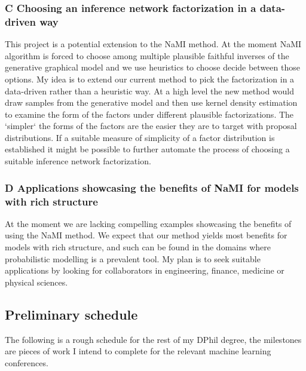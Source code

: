 \documentclass[12pt]{article}
\begin{document}
\subsubsection*{C \quad Choosing an inference network factorization in a data-driven way}
This project is a potential extension to the NaMI method.
At the moment NaMI algorithm is forced to choose among multiple plausible faithful inverses of the generative graphical model and we use  heuristics to choose decide between those options.
My idea is to extend our current method to pick the factorization in a data-driven rather than a heuristic way.
At a high level the new method would draw samples from the generative model and then use kernel density estimation to examine the form of the factors under different plausible factorizations. 
The `simpler` the forms of the factors are the easier they are to target with proposal distributions.
If a suitable measure of simplicity of a factor distribution is established it might be possible to further automate the process of choosing a suitable inference network factorization.


\subsubsection*{D \quad Applications showcasing the benefits of NaMI for models with rich structure}
At the moment we are lacking compelling examples showcasing the benefits of using the NaMI method.
We expect that our method yields most benefits for models with rich structure, and such can be found in the domains where probabilistic modelling is a prevalent tool.
My plan is to seek suitable applications by looking for collaborators in engineering, finance, medicine or physical sciences.


\newpage
\subsection{Preliminary schedule}
The following is a rough schedule for the rest of my DPhil degree, the milestones are pieces of work I intend to complete for the relevant machine learning conferences.
\end{document}
